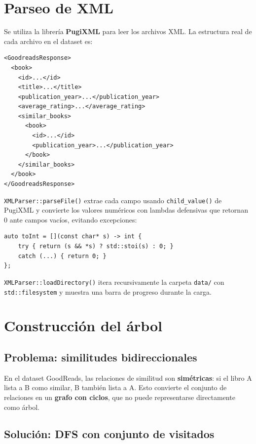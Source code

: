\documentclass[12pt, a4paper]{article}
\begin{document}
\section{Parseo de XML}

Se utiliza la librería \textbf{PugiXML} para leer los archivos XML. La estructura
real de cada archivo en el dataset es:

\begin{verbatim}
<GoodreadsResponse>
  <book>
    <id>...</id>
    <title>...</title>
    <publication_year>...</publication_year>
    <average_rating>...</average_rating>
    <similar_books>
      <book>
        <id>...</id>
        <publication_year>...</publication_year>
      </book>
    </similar_books>
  </book>
</GoodreadsResponse>
\end{verbatim}

\texttt{XMLParser::parseFile()} extrae cada campo usando \texttt{child\_value()} de
PugiXML y convierte los valores numéricos con lambdas defensivas que retornan 0
ante campos vacíos, evitando excepciones:

\begin{lstlisting}
auto toInt = [](const char* s) -> int {
    try { return (s && *s) ? std::stoi(s) : 0; }
    catch (...) { return 0; }
};
\end{lstlisting}

\texttt{XMLParser::loadDirectory()} itera recursivamente la carpeta \texttt{data/}
con \texttt{std::filesystem} y muestra una barra de progreso durante la carga.

\section{Construcción del árbol}

\subsection{Problema: similitudes bidireccionales}

En el dataset GoodReads, las relaciones de similitud son \textbf{simétricas}: si el
libro A lista a B como similar, B también lista a A. Esto convierte el conjunto de
relaciones en un \textbf{grafo con ciclos}, que no puede representarse directamente
como árbol.

\subsection{Solución: DFS con conjunto de visitados}
\end{document}
